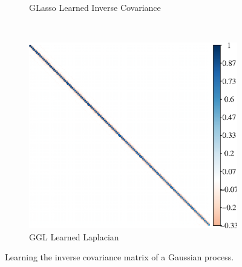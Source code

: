 \begin{figure}[!htb]
\begin{subfigure}[b]{0.3\textwidth}
        \caption{GLasso Learned Inverse Covariance}
    \end{subfigure}
    ~
    \begin{subfigure}[b]{0.3\textwidth}
        \includegraphics[width=\textwidth]{gaussian-process/latex/figures/periodic_gaussian_block_ggl.eps}
        \caption{GGL Learned Laplacian}
    \end{subfigure}
    \caption{Learning the inverse covariance matrix of a Gaussian process.}
        \label{fig:gps}
\end{figure}
